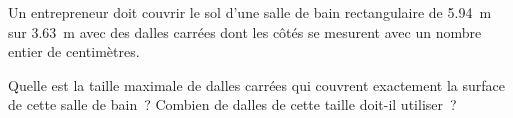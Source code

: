 %
%
Un entrepreneur doit couvrir le sol d'une salle de bain rectangulaire de \SI{5,94}{m} sur \SI{3,63}{m} avec des dalles carrées dont les côtés se mesurent avec un nombre entier de centimètres.
    \begin{tasks}
        \task Quelle est la taille maximale de dalles carrées qui couvrent exactement la surface de cette salle de bain~?
        \task Combien de dalles de cette taille doit-il utiliser~?
    \end{tasks}
